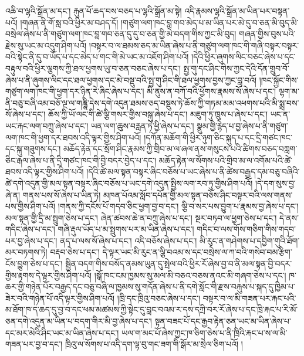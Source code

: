 འཆི་བ་ལྷའི་སྒྲོན་མ་དང་། རྐུན་པོ་ཆད་བས་བཅད་པ་ལྷའི་སྒྲོན་མ་སྟེ། འདི་རྣམས་ལྷའི་སྒྲོན་མ་ཡིན་པར་བསྟན་པའོ། །གཞན་ནི་གོ་སླ་བའི་ཕྱིར་མ་བཤད་དོ། །གཙུག་ལག་ཁང་བླ་གབ་མེད་པ་མ་ཡིན་པར་མེ་དུ་བ་ཅན་མི་བུད་མི་བསྲེལ་ཞེས་པ་ནི་གཙུག་ལག་ཁང་བླ་གབ་ཅན་དུ་དུ་བ་ཅན་གྱི་མེ་བདག་གིས་ཀྱང་མི་བུད། གཞན་གྱིས་བུས་པའི་རྗེས་སུ་ཡང་མ་འདུག་ཤིག་པའོ། །བསྟར་བ་ལ་ཐམས་ཅད་མ་ཡིན་ཞེས་པ་ནི་གཙུག་ལག་ཁང་གི་གཞི་བསྟར་བསྟར་བའི་སྟེང་ནི་དུ་བ་ཡོད་པ་དང་མེད་པ་གང་གི་མེ་ཡང་མ་འཇོག་ཤིག་པའོ། །དེའི་ཕྱིར་ཞུགས་ལིང་བཅང་ཞེས་པ་དང་བརྟུལ་བའི་ཕྱིར་ལྕགས་ཀྱི་ཐལ་ཕྱགས་ཡུ་བ་ཅན་བཅང་ཞེས་པ་དང་། སྤྱ་གུ་དང་ཤིང་གིས་ཀྱང་དེའི་དོན་གྲུབ་བོ་ཞེས་པ་ནི་ཞུགས་ལིང་དང་ཐལ་ཕྱགས་དང་མེ་བསྡུ་བའི་སྤྱ་གུ་ཤིང་གི་ཐལ་ཕྱགས་བྱས་ཀྱང་བླ་བའོ། །ཁང་སྐྱོང་གིས་གཙུག་ལག་ཁང་གི་ཕྱག་དར་ཉིན་རེ་ཞིང་ཞེས་པ་དང་། མི་ནུས་ན་བཀོ་བའི་ཕྱོགས་རྣམས་སོ་ཞེས་པ་དང་། ལྷག་མ་ནི་བཅུ་བཞི་འམ་བཅོ་ལྔ་ལ་གཎྜཱི་དེས་དགེ་འདུན་ཐམས་ཅད་བསྡུས་ཏེ་ཆོས་ཀྱི་གཏམ་མམ་འཕགས་པའི་མི་སྨྲ་བས་སོ་ཞེས་པ་དང་། ཆོས་ཀྱི་ཡོ་ལང་གི་ཚེ་ལྕི་གསར་གྱིས་བསྐུ་ཞེས་པ་དང་། མཇུག་ཏུ་ཁྲུས་པ་ཞེས་པ་དང་། ཡང་ན་ཡང་རྐང་ལག་བཀྲུ་ཞེས་པ་དང་། ཡན་ལག་ཆུས་བརླན་ཏེ་ཕྱི་ཞེས་པ་དང་། སྣུམ་གྱི་རྙེད་པ་བྱ་ཞེས་པ་ནི་གཙུག་ལག་ཁང་གི་ཕྱག་དར་ཐབས་འདི་ལྟར་གྱིས་ཤིག་པའོ། །དཀོན་མཆོག་གི་ཕྱིར་ཉུག་ཅིང་སྐུད་པ་དང་དྲི་གཙང་ཁང་དང་སྐུ་གཟུགས་དང་། མཆོད་རྟེན་དང་སྲོག་ཤིང་རྣམས་ཀྱི་གྲིབ་མ་ལ་ཞལ་ནས་གསུངས་པའི་ཚིགས་བཅད་བཀླག་ཅིང་རྒལ་ཞེས་པ་ནི་དྲི་གཙང་ཁང་གི་བྱི་བདར་བྱེད་པ་དང་། མཆོད་རྟེན་ལ་སོགས་པའི་གྲིབ་མ་ལ་འགོམ་པའི་ཚེ་ཐབས་འདི་ལྟར་གྱིས་ཤིག་པའོ། །དེའི་ཚེ་མལ་སྟན་བསྟར་ཞིང་བཅོས་པ་ཡང་ཞེས་པ་ནི་ཚེས་བརྒྱད་དམ་བཅུ་བཞིའི་ཚེ་དགེ་འདུན་གྱི་མལ་སྟན་བསྟར་ཞིང་བཅོས་པ་ཡང་དགེ་འདུན་སྤྱིས་ལག་རབ་ཏུ་གྱིས་ཤིག་པའོ། །དེ་དག་སུས་བྱ་ཞེ་ན། གནས་པས་སོ་ཞེས་པ་ཡིན་ཏེ། མཁན་པོའམ་སློབ་དཔོན་གྱི་མལ་སྟན་བཅོས་ཤིང་བསྟར་བའི་ལས་གནས་པས་གྱིས་ཤིག་པའོ། །གནས་ཀྱི་དངོས་པོ་གདབ་ཅིང་ཕྱག་བྱ་བ་དང་། ལྕི་བ་སར་པས་བྱུག་པ་རྣམས་བྱ་ཞེས་པ་དང་། མལ་སྟན་གྱི་དྲི་མ་སྤྲུག་ཅེས་པ་དང་། ཞེན་ཚབས་ཆེ་ན་བཀྲུ་ཞེས་པ་དང་། སྔར་བཏབ་ལ་ཕྱག་ཅེས་པ་དང་། དེ་ནས་གདིང་ཞེས་པ་དང་། གཞི་རྡུལ་ཡོད་པ་མ་སྤྲུགས་པར་མ་ཡིན་ཞེས་པ་དང་། གདིང་བ་ལས་གོས་གཅིག་གིས་གདབ་པར་བྱ་ཞེས་པ་དང་། ནད་པ་ལས་སོ་ཞེས་པ་དང་། འདི་བཅོས་ཞེས་པ་དང་། མི་རུང་ན་གཤེགས་པ་དབྱིག་གུའི་ཐོག་མར་བཏགས་ཏེ། བརྡབ་ཅེས་པ་དང་། དེ་ལྟར་ཡང་མི་རུང་ན་ལྕི་བའམ་ས་དང་བསྲེས་ལ་ཀ་བའི་གསེབ་བམ་རྩིག་ངོས་བྱུག་ཅེས་པ་དང་། སྦྱིན་བདག་གིས་བསོད་ནམས་ཡུན་དུ་སྤེལ་བའི་ཕྱིར་རོ་ཞེས་བྱ་བ་ནི་མལ་སྟན་བྱི་བདར་གྱིས་རྟགས་དེ་ལྟར་གྱིས་ཤིག་པའོ། །སྒོ་ཁང་ངམ་ཁྱམས་སུ་མལ་མི་བཅའ་བཅས་ནའང་མི་གཞག་ཅེས་པ་དང་། ཁ་ཆར་གྱི་གཉེན་པོར་བརྒྱད་དང་བཅུ་བཞི་ལ་ཁྱམས་སུ་གདོན་ཞེས་པ་ནི་དགེ་སློང་གི་རྫས་བརྐུས་པ་སྐད་དུ་ཁྱིམ་པ་ཟེར་བའི་གཉེན་པོ་འདི་ལྟར་གྱིས་ཤིག་པའོ། །ཁྲི་དང་ཁྲིའུ་བཅང་ཞེས་པ་དང་། བསྟར་བ་ལ་མི་གཟན་པར་རྐང་པའི་མ་ཐོག་ཁ་ད་ཆད་དུ་བྱ་བ་དང་ཕམ་མཚམས་ཀྱི་སྟེང་དུ་བླང་བའམ་ར་དས་དཀྲི་བར་རོ་ཞེས་པ་དང་ཁྲི་རྐང་པ་རི་མོ་ཅན་དགེ་འདུན་མ་ཡིན་པ་བདག་གིར་མི་བྱ་ཞེས་པ་དང་། སྟན་བཟང་པོ་དང་རྒྱབ་རྟེན་ཅན་ཡང་མ་ཡིན་ཞེས་པ་དང་མར་མེའི་ཤིང་ཡང་མ་ཡིན་ཞེས་པ་དང་། ཡལ་ག་མང་པོ་ཞེས་ཀྱང་ཁ་ཅིག་ཅེས་པ་ནི་ཁྲིའི་རྐང་པ་ས་ལ་མི་གཟན་པར་བྱ་བ་དང་། ཁྲིའུ་ལ་སོགས་པ་འདི་དག་ལྟ་བུ་གང་ཟག་གི་སྒོར་མ་སྲེལ་ཅིག་པའོ། །
